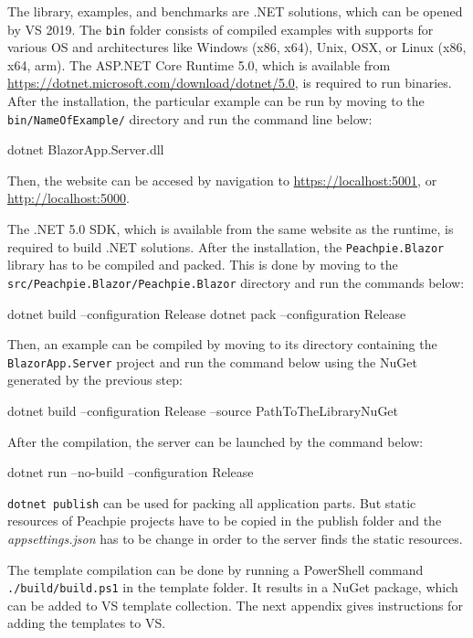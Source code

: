 The library, examples, and benchmarks are .NET solutions, which can be opened by \ac{VS} 2019.
The \texttt{bin} folder consists of compiled examples with supports for various OS and architectures like Windows (x86, x64), Unix, OSX, or Linux (x86, x64, arm).
The ASP.NET Core Runtime 5.0, which is available from \url{https://dotnet.microsoft.com/download/dotnet/5.0}, is required to run binaries.
After the installation, the particular example can be run by moving to the \texttt{bin/NameOfExa\-mple/} directory and run the command line below:
\par
\begin{code}[frame=none]
dotnet BlazorApp.Server.dll
\end{code}
\par
Then, the website can be accesed by navigation to \url{https://localhost:5001}, or \url{http://localhost:5000}.
\par
The .NET 5.0 SDK, which is available from the same website as the runtime, is required to build .NET solutions.
After the installation, the \texttt{Peachpie.Blazor} library has to be compiled and packed. 
This is done by moving to the \texttt{src/Peach\-pie.Blazor/Peachpie.Blazor} directory and run the commands below:
\par
\begin{code}[frame=none]
dotnet build --configuration Release
dotnet pack --configuration Release
\end{code}
\par
Then, an example can be compiled by moving to its directory containing the \texttt{BlazorApp.Server} project and run the command below using the NuGet generated by the previous step:
\par
\begin{code}[frame=none]
dotnet build --configuration Release --source PathToTheLibraryNuGet
\end{code}
\par
After the compilation, the server can be launched by the command below:
\par
\begin{code}[frame=none]
dotnet run --no-build --configuration Release
\end{code}
\par
\texttt{dotnet publish} can be used for packing all application parts. But static resources of Peachpie projects have to be copied in the publish folder and the \textit{appsettings.json} has to be change in order to the server finds the static resources. 
\par
The template compilation can be done by running a PowerShell command \texttt{./build/build.ps1} in the template folder.
It results in a NuGet package, which can be added to VS template collection.
The next appendix gives instructions for adding the templates to VS.